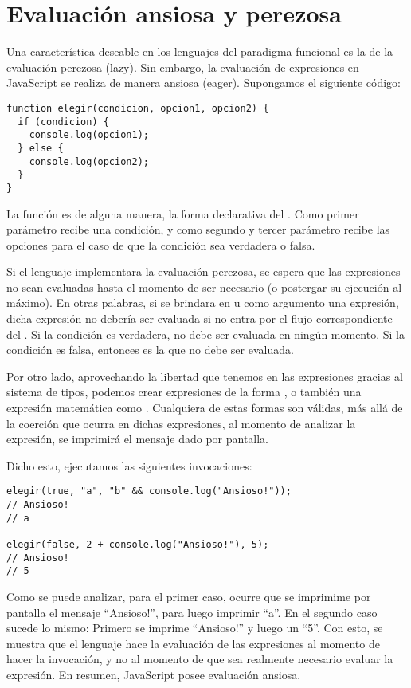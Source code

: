 \section{Evaluación ansiosa y perezosa}

Una característica deseable en los lenguajes del paradigma funcional es la de la evaluación perezosa (lazy). Sin embargo, la evaluación de expresiones en JavaScript se realiza de manera ansiosa (eager). Supongamos el siguiente código:

\begin{lstlisting}[title={Creando una función condicional}]
function elegir(condicion, opcion1, opcion2) {
  if (condicion) {
    console.log(opcion1);
  } else {
    console.log(opcion2);
  }
}
\end{lstlisting}

La función  es de alguna manera, la forma declarativa del . Como primer parámetro recibe una condición, y como segundo y tercer parámetro recibe las opciones para el caso de que la condición sea verdadera o falsa.

Si el lenguaje implementara la evaluación perezosa, se espera que las expresiones no sean evaluadas hasta el momento de ser necesario (o postergar su ejecución al máximo). En otras palabras, si se brindara en  u  como argumento una expresión, dicha expresión no debería ser evaluada si no entra por el flujo correspondiente del . Si la condición es verdadera,  no debe ser evaluada en ningún momento. Si la condición es falsa, entonces es  la que no debe ser evaluada.

Por otro lado, aprovechando la libertad que tenemos en las expresiones gracias al sistema de tipos, podemos crear expresiones de la forma , o también una expresión matemática como . Cualquiera de estas formas son válidas, más allá de la coerción que ocurra en dichas expresiones, al momento de analizar la expresión, se imprimirá el mensaje dado por pantalla.

Dicho esto, ejecutamos las siguientes invocaciones:

\begin{lstlisting}[title={Analizando resultados de las invocaciones}]
elegir(true, "a", "b" && console.log("Ansioso!"));
// Ansioso!
// a

elegir(false, 2 + console.log("Ansioso!"), 5);
// Ansioso!
// 5
\end{lstlisting}

Como se puede analizar, para el primer caso, ocurre que se imprimime por pantalla el mensaje "`Ansioso!"', para luego imprimir "`a"'. En el segundo caso sucede lo mismo: Primero se imprime "`Ansioso!"' y luego un "`5"'. Con esto, se muestra que el lenguaje hace la evaluación de las expresiones al momento de hacer la invocación, y no al momento de que sea realmente necesario evaluar la expresión. En resumen, JavaScript posee evaluación ansiosa.

